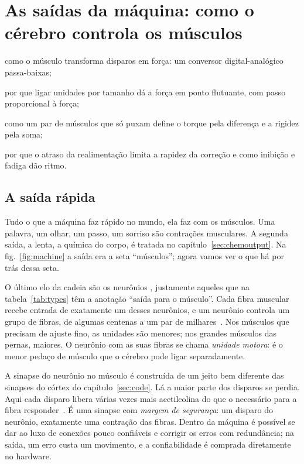\chapter{As saídas da máquina: como o cérebro controla os músculos}
\label{sec:muscles}
\begin{chaptergoals}
\item como o músculo transforma disparos em força: um conversor digital-analógico passa-baixas;
\item por que ligar unidades por tamanho dá a força em ponto flutuante, com passo proporcional à força;
\item como um par de músculos que só puxam define o torque pela diferença e a rigidez pela soma;
\item por que o atraso da realimentação limita a rapidez da correção e como inibição e fadiga dão ritmo.
\end{chaptergoals}

\section{A saída rápida}

Tudo o que a máquina faz rápido no mundo, ela faz com os músculos. Uma palavra, um olhar, um passo, um sorriso são contrações musculares. A segunda saída, a lenta, a química do corpo, é tratada no capítulo~\ref{sec:chemoutput}. Na fig.~\ref{fig:machine} a saída era a seta ``músculos''; agora vamos ver o que há por trás dessa seta.

O último elo da cadeia são os neurônios , justamente aqueles que na tabela~\ref{tab:types} têm a anotação ``saída para o músculo''. Cada fibra muscular recebe entrada de exatamente um desses neurônios, e um neurônio controla um grupo de fibras, de algumas centenas a um par de milhares~\cite{Feinstein1955mu}. Nos músculos que precisam de ajuste fino, as unidades são menores; nos grandes músculos das pernas, maiores. O neurônio com as suas fibras se chama \emph{unidade motora}: é o menor pedaço de músculo que o cérebro pode ligar separadamente.

A sinapse do neurônio no músculo é construída de um jeito bem diferente das sinapses do córtex do capítulo~\ref{sec:code}. Lá a maior parte dos disparos se perdia. Aqui cada disparo libera várias vezes mais acetilcolina do que o necessário para a fibra responder~\cite{WoodSlater2001}. É uma sinapse com \emph{margem de segurança}: um disparo do neurônio, exatamente uma contração das fibras. Dentro da máquina é possível se dar ao luxo de conexões pouco confiáveis e corrigir os erros com redundância; na saída, um erro custa um movimento, e a confiabilidade é comprada diretamente no hardware.

